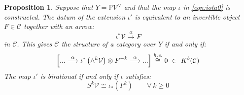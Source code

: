 \documentclass[12pt]{amsart}
\numberwithin{equation}{section}
\newtheorem{proposition}[theorem]{Proposition}
\theoremstyle{definition}
\theoremstyle{remark}
\newcommand{\PP}{\mathbb{P}}
\newcommand{\cat}{\mathcal{C}}
\newcommand{\CV}{\mathcal{V}}
\renewcommand{\1}{\mathbf{1}}
\newcommand{\ehe}{\emph{h.e.}}
\begin{document}
\begin{proposition}
\label{prop:lift0}
Suppose that $Y=\PP \CV^{\vee}$ and that the map $\iota$ in \eqref{eqn:iota0} is constructed. The datum of the extension $\iota'$ is equivalent to an invertible object $F \in \cat$ together with an arrow:
\begin{equation}
\label{eqn:datum0}
\iota^*\CV \stackrel{\alpha}\longrightarrow F
\end{equation}
in $\cat$. This gives $\cat$ the structure of a category over $Y$ if and only if:
\begin{equation}
\label{eqn:koszul0}
\left[ ... \stackrel{\alpha}\longrightarrow \iota^*\left(\wedge^k \CV\right) \otimes F^{-k} \stackrel{\alpha}\longrightarrow ... \right] \stackrel{\ehe}\cong 0 \ \in \ K^b(\cat)
\end{equation}
The map $\iota'$ is birational if and only if $\iota$ satisfies:
\begin{equation}
\label{eqn:properproj0}
S^k\CV \cong \iota_*(F^k) \qquad \forall \ k\geq 0
\end{equation}

\end{proposition}
\end{document}
